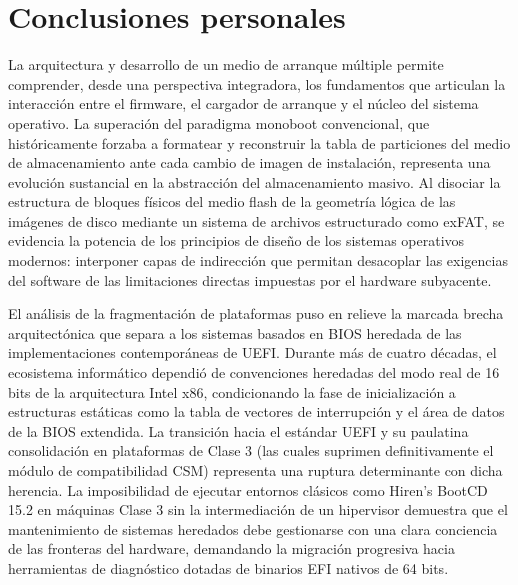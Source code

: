 \documentclass[12pt]{article}
\begin{document}
\section{Conclusiones personales}
\label{sec:conclusionesPersonales}

La arquitectura y desarrollo de un medio de arranque múltiple permite comprender, desde una perspectiva integradora, los fundamentos que articulan la interacción entre el firmware, el cargador de arranque y el núcleo del sistema operativo. La superación del paradigma monoboot convencional, que históricamente forzaba a formatear y reconstruir la tabla de particiones del medio de almacenamiento ante cada cambio de imagen de instalación, representa una evolución sustancial en la abstracción del almacenamiento masivo. Al disociar la estructura de bloques físicos del medio flash de la geometría lógica de las imágenes de disco mediante un sistema de archivos estructurado como exFAT, se evidencia la potencia de los principios de diseño de los sistemas operativos modernos: interponer capas de indirección que permitan desacoplar las exigencias del software de las limitaciones directas impuestas por el hardware subyacente.

El análisis de la fragmentación de plataformas puso en relieve la marcada brecha arquitectónica que separa a los sistemas basados en BIOS heredada de las implementaciones contemporáneas de UEFI. Durante más de cuatro décadas, el ecosistema informático dependió de convenciones heredadas del modo real de 16 bits de la arquitectura Intel x86, condicionando la fase de inicialización a estructuras estáticas como la tabla de vectores de interrupción y el área de datos de la BIOS extendida. La transición hacia el estándar UEFI y su paulatina consolidación en plataformas de Clase 3 (las cuales suprimen definitivamente el módulo de compatibilidad CSM) representa una ruptura determinante con dicha herencia. La imposibilidad de ejecutar entornos clásicos como Hiren's BootCD 15.2 en máquinas Clase 3 sin la intermediación de un hipervisor demuestra que el mantenimiento de sistemas heredados debe gestionarse con una clara conciencia de las fronteras del hardware, demandando la migración progresiva hacia herramientas de diagnóstico dotadas de binarios EFI nativos de 64 bits.
\end{document}
